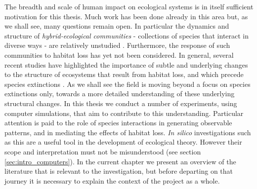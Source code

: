 The breadth and scale of human impact on ecological systems is in itself sufficient motivation for this thesis. Much work has been done already in this area but, as we shall see, many questions remain open. In particular the dynamics and structure of \emph{hybrid-ecological communities} - collections of species that interact in diverse ways - are relatively unstudied \cite{kefi2012more,fontaine2011ecological}. Furthermore, the response of such communities to habitat loss has yet not been considered. In general, several recent studies have highlighted the importance of subtle and underlying changes to the structure of ecosystems that result from habitat loss, and which precede species extinctions \cite{tylianakis2007habitat,sole2006ecological,laliberte2010deforestation,albrecht2007interaction,spiesman2013habitat,hagen2012biodiversity,gonzalez2011disentangled}. As we shall see the field is moving beyond a focus on species extinctions only, towards a more detailed understanding of these underlying structural changes. In this thesis we conduct a number of experiments, using computer simulations, that aim to contribute to this understanding. Particular attention is paid to the role of species interactions in generating observable patterns, and in mediating the effects of habitat loss. \emph{In silico} investigations such as this are a useful tool in the development of ecological theory. However their scope and interpretation must not be misunderstood (see section \ref{sec:intro_computers}). In the current chapter we present an overview of the literature that is relevant to the investigation, but before departing on that journey it is necessary to explain the context of the project as a whole.


